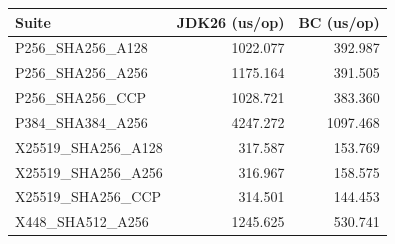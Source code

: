 \begin{tabular}{lrr}
\hline
Suite & JDK26 (us/op) & BC (us/op) \\
\hline
P256_SHA256_A128 & 1022.077 & 392.987 \\
P256_SHA256_A256 & 1175.164 & 391.505 \\
P256_SHA256_CCP & 1028.721 & 383.360 \\
P384_SHA384_A256 & 4247.272 & 1097.468 \\
X25519_SHA256_A128 & 317.587 & 153.769 \\
X25519_SHA256_A256 & 316.967 & 158.575 \\
X25519_SHA256_CCP & 314.501 & 144.453 \\
X448_SHA512_A256 & 1245.625 & 530.741 \\
\hline
\end{tabular}
